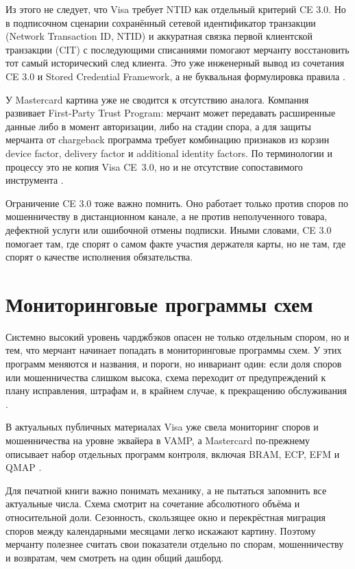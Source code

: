 Из этого не следует, что Visa требует NTID как отдельный
критерий CE 3.0. Но в подписочном сценарии сохранённый сетевой
идентификатор транзакции (Network Transaction ID, NTID) и аккуратная
связка первой клиентской транзакции (CIT) с последующими списаниями
помогают мерчанту восстановить тот самый исторический след клиента.
Это уже инженерный вывод из сочетания CE 3.0 и Stored Credential
Framework, а не буквальная формулировка правила
\cite{visa-ce30-merchant-readiness}\cite{visa-scf}.

У Mastercard картина уже не сводится к отсутствию аналога.
Компания развивает First-Party Trust Program: мерчант может передавать
расширенные данные либо в момент авторизации, либо на стадии спора, а
для защиты мерчанта от chargeback программа требует комбинацию
признаков из корзин device factor, delivery factor и additional
identity factors. По терминологии и процессу это не копия
Visa CE~3.0, но и не отсутствие
сопоставимого инструмента
\cite{mc-first-party-trust}\cite{mc-dispute-management}.

Ограничение CE 3.0 тоже важно помнить. Оно работает только против
споров по мошенничеству в дистанционном канале, а не против неполученного
товара, дефектной услуги или ошибочной отмены подписки. Иными словами,
CE 3.0 помогает там, где спорят о самом факте участия держателя карты,
но не там, где спорят о качестве исполнения обязательства.

\section{Мониторинговые программы схем}
\label{sec:disputes-monitoring}

Системно высокий уровень чарджбэков опасен не только отдельным спором,
но и тем, что мерчант начинает попадать в мониторинговые программы
схем. У этих программ меняются и названия, и пороги, но инвариант один:
если доля споров или мошенничества слишком высока, схема переходит от
предупреждений к плану исправления, штрафам и, в крайнем случае,
к прекращению обслуживания \cite{visa-dispute-rules}\cite{mc-chargeback-guide}.

В актуальных публичных материалах Visa уже свела мониторинг
споров и мошенничества на уровне эквайера в VAMP, а Mastercard
по-прежнему описывает набор отдельных программ контроля, включая BRAM,
ECP, EFM и QMAP
\cite{visa-vamp-intro}\cite{mc-compliance-programs}.

Для печатной книги важно понимать механику, а не пытаться запомнить все
актуальные числа. Схема смотрит на сочетание
абсолютного объёма и относительной доли. Сезонность, скользящее окно и
перекрёстная миграция споров между календарными месяцами легко искажают
картину. Поэтому мерчанту полезнее считать свои показатели отдельно по
спорам, мошенничеству и возвратам, чем смотреть на один общий дашборд.

